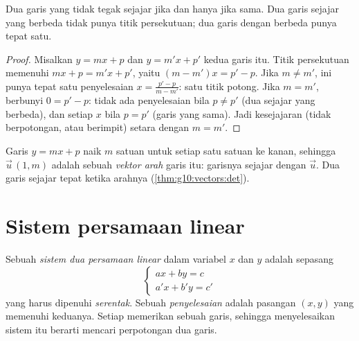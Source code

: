 \begin{proposition}\label{prop:g10:lines:parallel}
Dua garis yang tidak tegak sejajar jika dan hanya jika  sama.
Dua garis sejajar yang berbeda tidak punya titik persekutuan; dua garis
dengan  berbeda punya tepat satu.
\end{proposition}

\begin{proof}
Misalkan $y = mx + p$ dan $y = m'x + p'$ kedua garis itu. Titik persekutuan
memenuhi $mx + p = m'x + p'$, yaitu $(m - m')x = p' - p$. Jika $m \neq m'$,
 ini punya tepat satu penyelesaian $x = \frac{p' - p}{m - m'}$: satu
titik potong. Jika $m = m'$,  berbunyi $0 = p' - p$: tidak ada
penyelesaian bila $p \neq p'$ (dua sejajar yang berbeda), dan setiap $x$ bila
$p = p'$ (garis yang sama). Jadi kesejajaran (tidak berpotongan, atau berimpit)
setara dengan $m = m'$.
\end{proof}

\begin{remark}
Garis $y = mx + p$ naik $m$ satuan untuk setiap satu satuan ke kanan, sehingga
 $\vec u\,(1, m)$ adalah sebuah \emph{vektor
arah} garis itu: garisnya sejajar dengan
$\vec u$. Dua garis sejajar tepat ketika  arahnya
 (\cref{thm:g10:vectors:det}).
\end{remark}

\section{Sistem persamaan linear}

\begin{definition}\label{def:g10:lines:system}
Sebuah \emph{sistem dua persamaan linear} dalam
variabel $x$ dan $y$ adalah sepasang 
\[
\begin{cases}
a x + b y = c \\
a' x + b' y = c'
\end{cases}
\]
yang harus dipenuhi \emph{serentak}. Sebuah \emph{penyelesaian} adalah pasangan
$(x, y)$ yang memenuhi keduanya. Setiap  memerikan sebuah garis,
sehingga menyelesaikan sistem itu berarti mencari perpotongan dua garis.
\end{definition}

